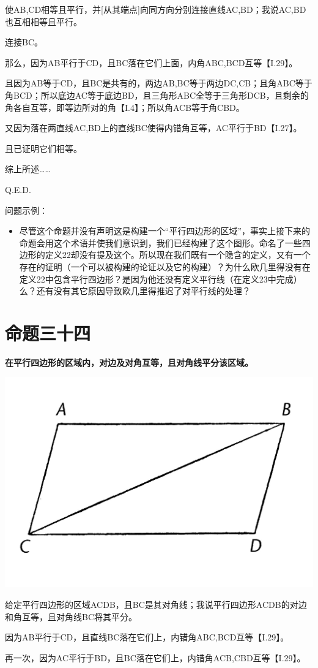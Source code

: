\documentclass[
]{book}
\providecommand{\tightlist}{%
  \setlength{\itemsep}{0pt}\setlength{\parskip}{0pt}}
\begin{document}
使AB,CD相等且平行，并{[}从其端点{]}向同方向分别连接直线AC,BD；我说AC,BD也互相相等且平行。

连接BC。

那么，因为AB平行于CD，且BC落在它们上面，内角ABC,BCD互等【I.29】。

且因为AB等于CD，且BC是共有的，两边AB,BC等于两边DC,CB；且角ABC等于角BCD；所以底边AC等于底边BD，且三角形ABC全等于三角形DCB，且剩余的角各自互等，即等边所对的角【I.4】；所以角ACB等于角CBD。

又因为落在两直线AC,BD上的直线BC使得内错角互等，AC平行于BD【I.27】。

且已证明它们相等。

综上所述\ldots\ldots{}

Q.E.D.

问题示例：

\begin{itemize}
\tightlist
\item
  尽管这个命题并没有声明这是构建一个``平行四边形的区域''，事实上接下来的命题会用这个术语并使我们意识到，我们已经构建了这个图形。命名了一些四边形的定义22却没有提及这个。所以现在我们既有一个隐含的定义，又有一个存在的证明（一个可以被构建的论证以及它的构建）？为什么欧几里得没有在定义22中包含平行四边形？是因为他还没有定义平行线（在定义23中完成）么？还有没有其它原因导致欧几里得推迟了对平行线的处理？
\end{itemize}

\hypertarget{ux547dux9898ux4e09ux5341ux56db}{%
\section{命题三十四}\label{ux547dux9898ux4e09ux5341ux56db}}

\textbf{在平行四边形的区域内，对边及对角互等，且对角线平分该区域。}

\includegraphics[width=0.3\linewidth]{./image/img523}

给定平行四边形的区域ACDB，且BC是其对角线；我说平行四边形ACDB的对边和角互等，且对角线BC将其平分。

因为AB平行于CD，且直线BC落在它们上，内错角ABC,BCD互等【I.29】。

再一次，因为AC平行于BD，且BC落在它们上，内错角ACB,CBD互等【I.29】。
\end{document}
